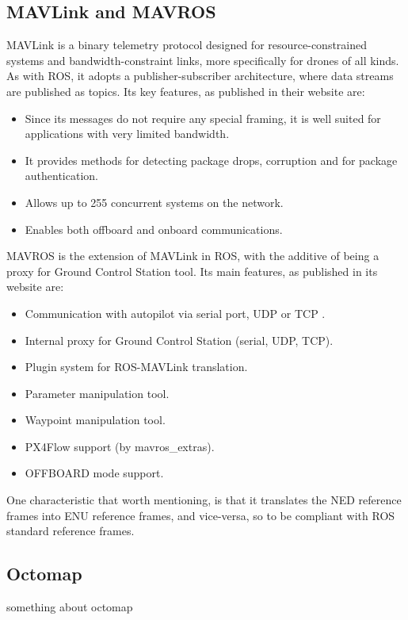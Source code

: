 \subsection{MAVLink and MAVROS}
\label{sssec:chapter2:drone:mavlink}
\nocite{mavlink}
MAVLink is a binary telemetry protocol designed for resource-constrained systems and bandwidth-constraint links, more specifically for drones of all kinds. As with ROS, it adopts a publisher-subscriber architecture, where data streams are published as topics. Its key features, as published in their website are:
\begin{itemize}
    \item Since its messages do not require any special framing, it is well suited for applications with very limited bandwidth.
    \item It provides methods for detecting package drops, corruption and for package authentication.
    \item Allows up to 255 concurrent systems on the network.
    \item Enables both offboard and onboard communications.
\end{itemize}
\nocite{mavros}
MAVROS is the extension of MAVLink in ROS, with the additive of being a proxy for Ground Control Station tool. Its main features, as published in its website are:
\begin{itemize}
    \item Communication with autopilot via serial port, UDP or TCP .
    \item Internal proxy for Ground Control Station (serial, UDP, TCP).
    \item Plugin system for ROS-MAVLink translation.
    \item Parameter manipulation tool.
    \item Waypoint manipulation tool.
    \item PX4Flow support (by mavros\_extras).
    \item OFFBOARD mode support.
\end{itemize}

One characteristic that worth mentioning, is that it translates the \ac{NED} reference frames into \ac{ENU} reference frames, and vice-versa, so to be compliant with ROS standard reference frames.

\subsection{Octomap}
\label{subsec:chapter1:ros:octomap}
something about octomap

